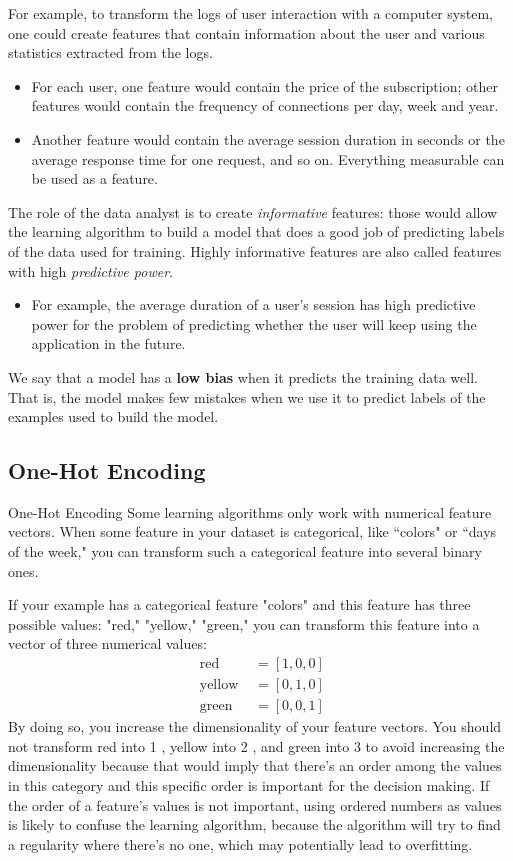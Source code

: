 \documentclass[9pt,dvipsnames]{beamer}
\begin{document}
	\begin{frame}
		For example, to transform the logs of user interaction with a computer system, one could create features that contain information about the user and various statistics extracted from the logs. 
		\begin{itemize}
			\item For each user, one feature would contain the price of the subscription; other features would contain the frequency of connections per day, week and year.
			\item Another feature would contain the average session duration in seconds or the average response time for one request, and so on. Everything measurable can be used as a feature. 
		\end{itemize}
		 The role of the data analyst is to create \textit{informative} features: those would allow the learning algorithm to build a model that does a good job of predicting labels of the data used for training. Highly informative features are also called features with high \textit{predictive power}. 
		 \begin{itemize}
		 	\item For example, the average duration of a user's session has high predictive power for the problem of predicting whether the user will keep using the application in the future.
		 \end{itemize}
		 We say that a model has a \textbf{low bias} when it predicts the training data well. That is, the model makes few mistakes when we use it to predict labels of the examples used to build the model.
	\end{frame}
	\subsection{One-Hot Encoding}
	\begin{frame}{One-Hot Encoding}
		Some learning algorithms only work with numerical feature vectors. When some feature in your dataset is categorical, like ``colors" or ``days of the week," you can transform such a categorical feature into several binary ones.
		
		If your example has a categorical feature "colors" and this feature has three possible values: "red," "yellow," "green," you can transform this feature into a vector of three numerical values:
		$$
		\begin{aligned}
			\text { red } & =[1,0,0] \\
			\text { yellow } & =[0,1,0] \\
			\text { green } & =[0,0,1]
		\end{aligned}
		$$
		By doing so, you increase the dimensionality of your feature vectors. You should not transform red into 1 , yellow into 2 , and green into 3 to avoid increasing the dimensionality because that would imply that there's an order among the values in this category and this specific order is important for the decision making. If the order of a feature's values is not important, using ordered numbers as values is likely to confuse the learning algorithm, because the algorithm will try to find a regularity where there's no one, which may potentially lead to overfitting.
	\end{frame}
\end{document}
